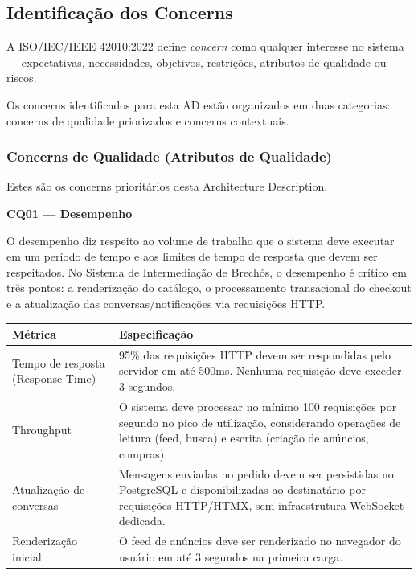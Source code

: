 ﻿\documentclass[12pt,a4paper]{article}
\begin{document}
\subsection{Identificação dos Concerns}

A ISO/IEC/IEEE 42010:2022 define \textit{concern} como qualquer interesse no sistema --- expectativas, necessidades, objetivos, restrições, atributos de qualidade ou riscos.

Os concerns identificados para esta AD estão organizados em duas categorias: concerns de qualidade priorizados e concerns contextuais.

\subsubsection{Concerns de Qualidade (Atributos de Qualidade)}

Estes são os concerns prioritários desta Architecture Description.

\vspace{0.5cm}

\noindent\textbf{CQ01 --- Desempenho}

O desempenho diz respeito ao volume de trabalho que o sistema deve executar em um período de tempo e aos limites de tempo de resposta que devem ser respeitados. No Sistema de Intermediação de Brechós, o desempenho é crítico em três pontos: a renderização do catálogo, o processamento transacional do checkout e a atualização das conversas/notificações via requisições HTTP.

\begin{longtable}{|p{4.5cm}|p{10cm}|}
\hline
\textbf{Métrica} & \textbf{Especificação} \\
\hline
Tempo de resposta (Response Time) & 95\% das requisições HTTP devem ser respondidas pelo servidor em até 500ms. Nenhuma requisição deve exceder 3 segundos. \\
\hline
Throughput & O sistema deve processar no mínimo 100 requisições por segundo no pico de utilização, considerando operações de leitura (feed, busca) e escrita (criação de anúncios, compras). \\
\hline
Atualização de conversas & Mensagens enviadas no pedido devem ser persistidas no PostgreSQL e disponibilizadas ao destinatário por requisições HTTP/HTMX, sem infraestrutura WebSocket dedicada. \\
\hline
Renderização inicial & O feed de anúncios deve ser renderizado no navegador do usuário em até 3 segundos na primeira carga. \\
\hline
\end{longtable}
\end{document}
